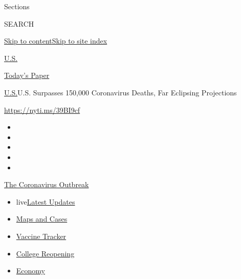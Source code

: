 Sections

SEARCH

\protect\hyperlink{site-content}{Skip to
content}\protect\hyperlink{site-index}{Skip to site index}

\href{https://www.nytimes.com/section/us}{U.S.}

\href{https://myaccount.nytimes.com/auth/login?response_type=cookie\&client_id=vi}{}

\href{https://www.nytimes.com/section/todayspaper}{Today's Paper}

\href{/section/us}{U.S.}\textbar{}U.S. Surpasses 150,000 Coronavirus
Deaths, Far Eclipsing Projections

\url{https://nyti.ms/39BI9cf}

\begin{itemize}
\item
\item
\item
\item
\item
\end{itemize}

\href{https://www.nytimes.com/news-event/coronavirus?action=click\&pgtype=Article\&state=default\&region=TOP_BANNER\&context=storylines_menu}{The
Coronavirus Outbreak}

\begin{itemize}
\tightlist
\item
  live\href{https://www.nytimes.com/2020/08/04/world/coronavirus-cases.html?action=click\&pgtype=Article\&state=default\&region=TOP_BANNER\&context=storylines_menu}{Latest
  Updates}
\item
  \href{https://www.nytimes.com/interactive/2020/us/coronavirus-us-cases.html?action=click\&pgtype=Article\&state=default\&region=TOP_BANNER\&context=storylines_menu}{Maps
  and Cases}
\item
  \href{https://www.nytimes.com/interactive/2020/science/coronavirus-vaccine-tracker.html?action=click\&pgtype=Article\&state=default\&region=TOP_BANNER\&context=storylines_menu}{Vaccine
  Tracker}
\item
  \href{https://www.nytimes.com/2020/08/02/us/covid-college-reopening.html?action=click\&pgtype=Article\&state=default\&region=TOP_BANNER\&context=storylines_menu}{College
  Reopening}
\item
  \href{https://www.nytimes.com/live/2020/08/04/business/stock-market-today-coronavirus?action=click\&pgtype=Article\&state=default\&region=TOP_BANNER\&context=storylines_menu}{Economy}
\end{itemize}

